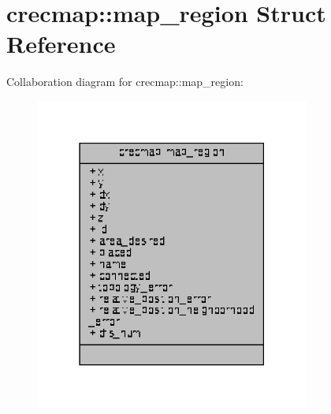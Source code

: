 \hypertarget{structcrecmap_1_1map__region}{}\section{crecmap\+:\+:map\+\_\+region Struct Reference}
\label{structcrecmap_1_1map__region}


Collaboration diagram for crecmap\+:\+:map\+\_\+region\+:\nopagebreak
\begin{figure}[H]
\begin{center}
\leavevmode
\includegraphics[width=255pt]{structcrecmap_1_1map__region__coll__graph}
\end{center}
\end{figure}
